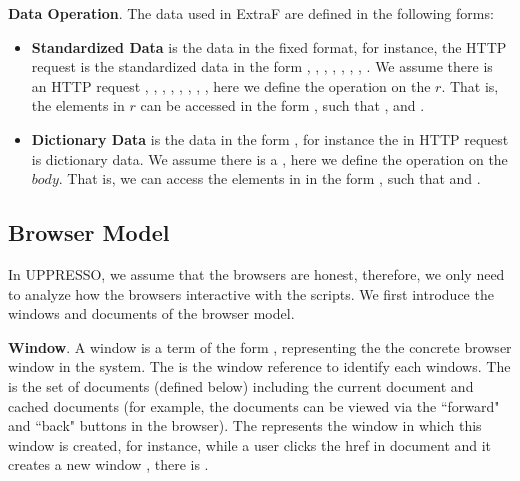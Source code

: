 \noindent\textbf{Data Operation}.
The data used in ExtraF are defined in the following forms:
\begin{itemize}
\item \textbf{Standardized Data} is the data in the fixed format, for instance, the HTTP request is the standardized data in the form , , , , , , , .  We assume there is an HTTP request   ,  ,  ,  ,  ,  \myss{\myangle{}},  \myss{\myangle{}},  \myss{\myangle{}\rangle}, here we define the operation on the $r$. That is, the elements in $r$ can be accessed in the form , such that ,   and .
\item \textbf{Dictionary Data} is the data in the form , for instance the  in HTTP request is dictionary data. We assume there is a , here we define the operation on the $body$. That is, we can access the elements in  in the form , such that  and .
\end{itemize}

\subsection{Browser Model}
In UPPRESSO, we assume that the browsers are honest, therefore, we only need to analyze how the browsers interactive with the scripts. 
We first introduce the windows and documents of the browser model.

\vspace{1mm}
\noindent\textbf{Window}. A window  is a term of the form , representing the  the concrete browser window in the system. The  is the window reference to identify each windows. The  is the set of documents (defined below) including the current document and cached documents (for example, the documents can be viewed via the ``forward" and ``back" buttons in the browser). The  represents the window in which this window is created, for instance, while a user clicks the href in document  and it creates a new window , there is .

